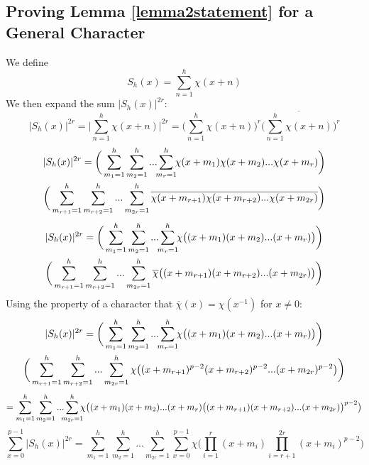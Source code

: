 \documentclass{report}
\begin{document}
\subsection{Proving Lemma \ref{lemma2statement} for a General Character}
We define
\begin{equation} \label{definesh}
S_h(x)=\sum\limits_{n=1}^{h}\chi(x+n)
\end{equation}
We then expand the sum $\lvert S_h(x)\rvert^{2r}$:
$$\lvert S_h(x)\rvert^{2r}= \Big\lvert\sum\limits_{n=1}^{h}\chi(x+n)\Big\rvert^{2r}= \Big(\sum\limits_{n=1}^{h}\chi(x+n)\Big)^r\Big(\overline{\sum\limits_{n=1}^{h}\chi(x+n)}\Big)^r$$
\begin{multline*}
\lvert S_h(x)\rvert^{2r} =\bigg(\sum\limits_{m_1=1}^h\sum\limits_{m_2=1}^h...\sum\limits_{\mathclap{m_{r}=1}}^h \chi(x+m_1)\chi(x+m_2)...\chi(x+m_{r})\bigg)
\\
\bigg(\sum\limits_{m_{r+1}=1}^h\sum\limits_{m_{r+2}=1}^h...\sum\limits_{m_{2r}=1}^h \overline{\chi(x+m_{r+1})\chi(x+m_{r+2})...\chi(x+m_{2r})}\bigg)
\end{multline*}
\begin{multline*}
\lvert S_h(x)\rvert^{2r} =\bigg(\sum\limits_{m_1=1}^h\sum\limits_{m_2=1}^h...\sum\limits_{\mathclap{m_{r}=1}}^h \chi\big((x+m_1)(x+m_2)...(x+m_{r})\big)\bigg)
\\
\bigg(\sum\limits_{m_{r+1}=1}^h\sum\limits_{m_{r+2}=1}^h...\sum\limits_{m_{2r}=1}^h \overline{\chi}\big((x+m_{r+1})(x+m_{r+2})...(x+m_{2r})\big)\bigg)
\end{multline*}
Using the property of a character that $\overline{\chi}(x)=\chi (x^{-1})$ for $x\neq0$:
\begin{multline*}
\lvert S_h(x)\rvert^{2r} =\bigg(\sum\limits_{m_1=1}^h\sum\limits_{m_2=1}^h...\sum\limits_{\mathclap{m_{r}=1}}^h \chi\big((x+m_1)(x+m_2)...(x+m_{r})\big)\bigg)
\\
\bigg(\sum\limits_{m_{r+1}=1}^h\sum\limits_{m_{r+2}=1}^h...\sum\limits_{m_{2r}=1}^h \chi\big((x+m_{r+1})^{p-2}(x+m_{r+2})^{p-2}...(x+m_{2r})^{p-2}\big)\bigg)
\end{multline*}
$$=\sum\limits_{m_1=1}^h\sum\limits_{m_2=1}^h...\sum\limits_{\mathclap{m_{2r}=1}}^h \chi\big((x+m_1)(x+m_2)...(x+m_{r})\big((x+m_{r+1})(x+m_{r+2})...(x+m_{2r})\big)^{p-2}\big)$$
\begin{equation} \label{generaltuple}
\sum_{x=0}^{p-1}\lvert S_h(x)\rvert^{2r}= \sum\limits_{m_1=1}^h\sum\limits_{m_2=1}^h...\sum\limits_{m_{2r}=1}^h
\sum_{x=0}^{p-1}\chi\Big(\prod_{i=1}^r(x+m_i)\prod_{i=r+1}^{2r}(x+m_{i})^{p-2}\Big)
\end{equation}
\end{document}
